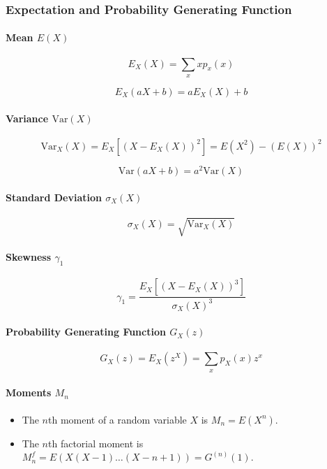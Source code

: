 \documentclass[twocolumn,english]{article}
\begin{document}
\subsubsection{Expectation and Probability Generating Function}

\paragraph{Mean $E\left(X\right)$}

\[
E_{X}\left(X\right)=\sum_{x}xp_{x}\left(x\right)
\]

\[
E_{X}\left(aX+b\right)=aE_{X}\left(X\right)+b
\]

\paragraph{Variance $\text{Var}\left(X\right)$}

\[
\text{Var}_{X}\left(X\right)=E_{X}\left[\left(X-E_{X}\left(X\right)\right)^{2}\right]=E\left(X^{2}\right)-\left(E\left(X\right)\right)^{2}
\]

\[
\text{Var}\left(aX+b\right)=a^{2}\text{Var}\left(X\right)
\]

\paragraph{Standard Deviation $\sigma_{X}\left(X\right)$}

\[
\sigma_{X}\left(X\right)=\sqrt{\text{Var}_{X}\left(X\right)}
\]

\paragraph{Skewness $\gamma_{1}$}

\[
\gamma_{1}=\frac{E_{X}\left[\left(X-E_{X}\left(X\right)\right)^{3}\right]}{\sigma_{X}\left(X\right)^{3}}
\]

\paragraph{Probability Generating Function $G_{X}\left(z\right)$}

\[
G_{X}\left(z\right)=E_{X}\left(z^{X}\right)=\sum_{x}p_{X}\left(x\right)z^{x}
\]

\paragraph{Moments $M_{n}$}
\begin{itemize}
\item The $n$th moment of a random variable $X$ is $M_{n}=E\left(X^{n}\right)$.
\item The $n$th factorial moment is $M_{n}^{f}=E\left(X\left(X-1\right)\dots\left(X-n+1\right)\right)=G^{(n)}\left(1\right)$.
\end{itemize}
\end{document}
